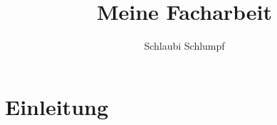 \documentclass[12pt,titlepage]{article}
\begin{document}
  
 	\title{Meine Facharbeit}     
	
        \author{Schlaubi Schlumpf}
        
 	\maketitle
	
   \tableofcontents
   \clearpage

   \section{Einleitung}
   
   
   \section{}
    
     \subsection{}
       \subsubsection{}    

   \section{}

 \begin{thebibliography}{99}
 \end{thebibliography}
\end{document}
